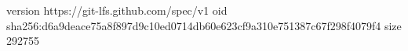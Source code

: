 version https://git-lfs.github.com/spec/v1
oid sha256:d6a9deace75a8f897d9c10ed0714db60e623cf9a310e751387c67f298f4079f4
size 292755
